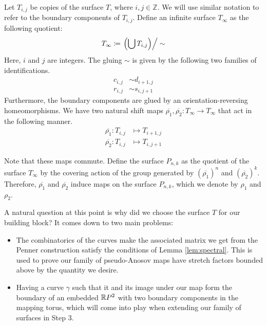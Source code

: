 Let $T_{i,j}$ be copies of the surface $T$, where $i,j \in \mathbb{Z}$. We will use similar notation to refer
to the boundary components of $T_{i,j}$. Define an infinite surface $T_\infty$ as the following quotient:
\begin{align*}
  T_\infty \coloneqq \left. \left( \bigcup T_{i,j} \right)\right/\sim
\end{align*}
Here, $i$ and $j$ are integers. The gluing $\sim$ is given by the following two families of
identifications.
\begin{align*}
  c_{i,j} &\sim d_{i+1,j} \\
  r_{i,j} &\sim s_{i,j+1}
\end{align*}
Furthermore, the boundary components are glued by an orientation-reversing homeomorphisms.  We have two
natural shift maps $\overline{\rho_1},\overline{\rho_2}: T_\infty \to T_\infty$ that act in the
following manner.
\begin{align*}
  \overline{\rho_1}: T_{i,j} &\mapsto T_{i+1, j} \\
  \overline{\rho_2}: T_{i,j} &\mapsto T_{i, j+1}
\end{align*}

Note that these maps commute. Define the surface $P_{n,k}$ as the quotient of the surface $T_\infty$ by the
covering action of the group generated by $(\overline{\rho_1})^n$ and $(\overline{\rho_2})^k$. Therefore,
$\overline{\rho_1}$ and $\overline{\rho_2}$ induce maps on the surface $P_{n,k}$, which we denote by $\rho_1$
and $\rho_2$.

A natural question at this point is why did we choose the surface $T$ for our building block? It comes down to
two main problems:
\begin{itemize}
\item The combinatorics of the curves make the associated matrix we get from the Penner construction satisfy
  the conditions of Lemma \ref{lem:spectral}. This is used to prove our family of pseudo-Anosov maps have
  stretch factors bounded above by the quantity we desire.
\item Having a curve $\gamma$ such that it and its image under our map form the boundary of an embedded
  $\mathbb{R} P^2$ with two boundary components in the mapping torus, which will come into play when extending our family of surfaces in Step 3.
\end{itemize}

